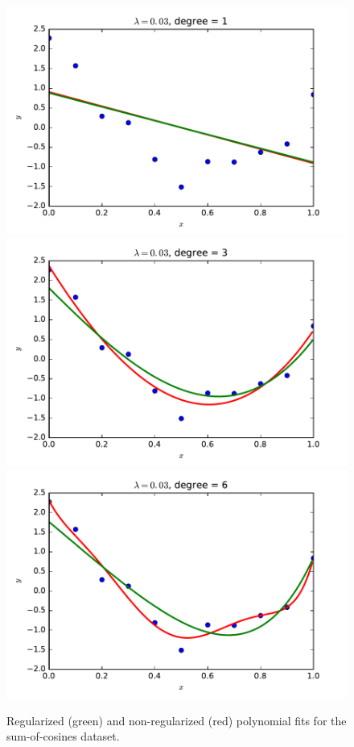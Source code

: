 \documentclass{article}
\begin{document}
\begin{multicols}{2}
\begin{figure}
   \includegraphics[width=\picwidth]{img/3-1_ridge_lambd30_degree1.pdf}
   \includegraphics[width=\picwidth]{img/3-1_ridge_lambd30_degree3.pdf}
   \includegraphics[width=\picwidth]{img/3-1_ridge_lambd30_degree6.pdf}
   \caption{Regularized (green) and non-regularized (red) polynomial fits for the sum-of-cosines dataset.}
   \label{fig:ridge}
\end{figure}


\end{multicols}
\end{document}
